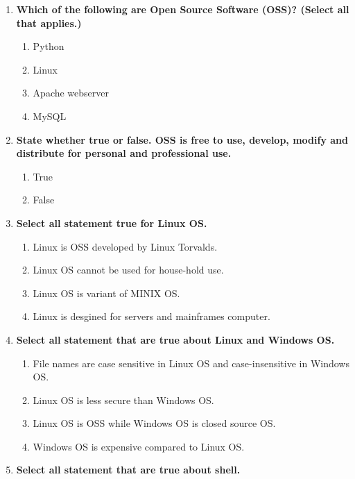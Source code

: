 \begin{flushleft}
	\begin{enumerate}
		\item \textbf{Which of the following are Open Source Software (OSS)? (Select all that applies.)}
		\begin{enumerate}[label=(\alph*)]
			\item Python %
			\item Linux %
			\item Apache webserver %
			\item MySQL %
		\end{enumerate}
		\bigskip
		\bigskip
		\item \textbf{State whether true or false. OSS is free to use, develop, modify and distribute for personal and professional use.}
		\begin{enumerate}[label=(\alph*)]
			\item True  %
			\item False
		\end{enumerate}
		\bigskip
		\bigskip
		\item \textbf{Select all statement true for Linux OS.}
		\begin{enumerate}[label=(\alph*)] 
			\item Linux is OSS developed by Linux Torvalds. %
			\item Linux OS cannot be used for house-hold use.
			\item Linux OS is variant of MINIX OS.    %
			\item Linux is desgined for servers and mainframes computer.   %
		\end{enumerate}
		\bigskip
		\bigskip
		\item \textbf{Select all statement that are true about Linux and Windows OS.}
		\begin{enumerate}[label=(\alph*)]
			\item File names are case sensitive in Linux OS and case-insensitive in Windows OS.  %
			\item Linux OS is less secure than Windows OS.   
			\item Linux OS is OSS while Windows OS is closed source OS.   %
			\item Windows OS is expensive compared to Linux OS.   %
		\end{enumerate}
		\bigskip
		\bigskip
		\item \textbf{Select all statement that are true about shell.}
		\begin{enumerate}[label=(\alph*)]

\end{enumerate}
\end{enumerate}
\end{flushleft}
